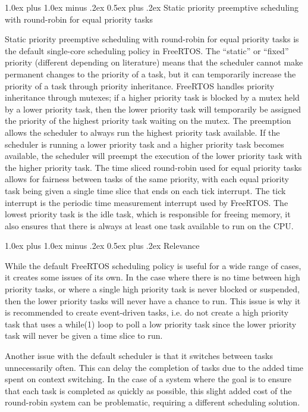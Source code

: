 \documentclass[transmag]{IEEEtran}
\makeatletter
\renewcommand{\section}{\@startsection{section}{1}{\z@}%
  {1.0ex plus 1.0ex minus .2ex}%
  {0.5ex plus .2ex}%
  {\normalfont\large\bfseries}}
\makeatother
\begin{document}
\section{Static priority preemptive scheduling with round-robin for equal priority tasks} 

Static priority preemptive scheduling with round-robin for equal priority tasks is the default single-core scheduling policy in FreeRTOS. The “static” or “fixed” priority (different depending on literature) means that the scheduler cannot make permanent changes to the priority of a task, but it can temporarily increase the priority of a task through priority inheritance. FreeRTOS handles priority inheritance through mutexes; if a higher priority task is blocked by a mutex held by a lower priority task, then the lower priority task will temporarily be assigned the priority of the highest priority task waiting on the mutex. The preemption allows the scheduler to always run the highest priority task available. If the scheduler is running a lower priority task and a higher priority task becomes available, the scheduler will preempt the execution of the lower priority task with the higher priority task. The time sliced round-robin used for equal priority tasks allows for fairness between tasks of the same priority, with each equal priority task being given a single time slice that ends on each tick interrupt. The tick interrupt is the periodic time measurement interrupt used by FreeRTOS. The lowest priority task is the idle task, which is responsible for freeing memory, it also ensures that there is always at least one task available to run on the CPU.  

\section{Relevance} 

While the default FreeRTOS scheduling policy is useful for a wide range of cases, it creates some issues of its own. In the case where there is no time between high priority tasks, or where a single high priority task is never blocked or suspended, then the lower priority tasks will never have a chance to run. This issue is why it is recommended to create event-driven tasks, i.e. do not create a high priority task that uses a while(1) loop to poll a low priority task since the lower priority task will never be given a time slice to run.  

Another issue with the default scheduler is that it switches between tasks unnecessarily often. This can delay the completion of tasks due to the added time spent on context switching. In the case of a system where the goal is to ensure that each task is completed as quickly as possible, this slight added cost of the round-robin system can be problematic, requiring a different scheduling solution. 
\end{document}
